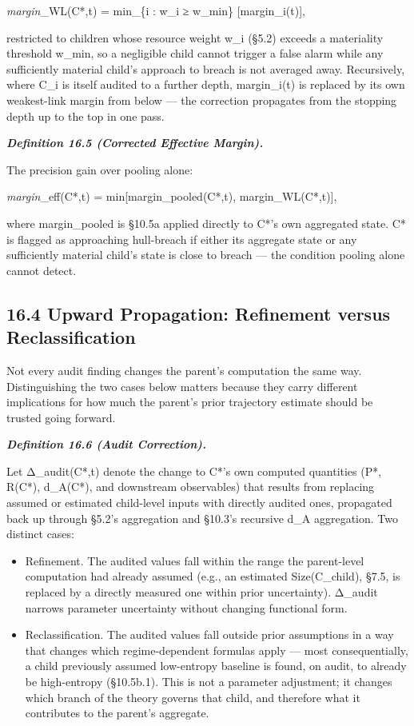 \documentclass[
]{article}
\begin{document}
\emph{margin}\_WL(C*,t) = min\_\{i : w\_i ≥ w\_min\} {[}margin\_i(t){]},

restricted to children whose resource weight w\_i (§5.2) exceeds a
materiality threshold w\_min, so a negligible child cannot trigger a
false alarm while any sufficiently material child's approach to breach
is not averaged away. Recursively, where C\_i is itself audited to a
further depth, margin\_i(t) is replaced by its own weakest-link margin
from below --- the correction propagates from the stopping depth up to
the top in one pass.

\emph{\textbf{Definition 16.5 (Corrected Effective Margin).}}

The precision gain over pooling alone:

\emph{margin}\_eff(C*,t) = min{[}margin\_pooled(C*,t),
margin\_WL(C*,t){]},

where margin\_pooled is §10.5a applied directly to C*'s own aggregated
state. C* is flagged as approaching hull-breach if either its aggregate
state or any sufficiently material child's state is close to breach ---
the condition pooling alone cannot detect.

\hypertarget{upward-propagation-refinement-versus-reclassification}{%
\subsection{16.4 Upward Propagation: Refinement versus
Reclassification}\label{upward-propagation-refinement-versus-reclassification}}

Not every audit finding changes the parent's computation the same way.
Distinguishing the two cases below matters because they carry different
implications for how much the parent's prior trajectory estimate should
be trusted going forward.

\emph{\textbf{Definition 16.6 (Audit Correction).}}

Let Δ\_audit(C*,t) denote the change to C*'s own computed quantities
(P*, R(C*), d\_A(C*), and downstream observables) that results from
replacing assumed or estimated child-level inputs with directly audited
ones, propagated back up through §5.2's aggregation and §10.3's
recursive d\_A aggregation. Two distinct cases:

\begin{itemize}
\item
  Refinement. The audited values fall within the range the parent-level
  computation had already assumed (e.g., an estimated Size(C\_child),
  §7.5, is replaced by a directly measured one within prior
  uncertainty). Δ\_audit narrows parameter uncertainty without changing
  functional form.
\item
  Reclassification. The audited values fall outside prior assumptions in
  a way that changes which regime-dependent formulas apply --- most
  consequentially, a child previously assumed low-entropy baseline is
  found, on audit, to already be high-entropy (§10.5b.1). This is not a
  parameter adjustment; it changes which branch of the theory governs
  that child, and therefore what it contributes to the parent's
  aggregate.
\end{itemize}
\end{document}

